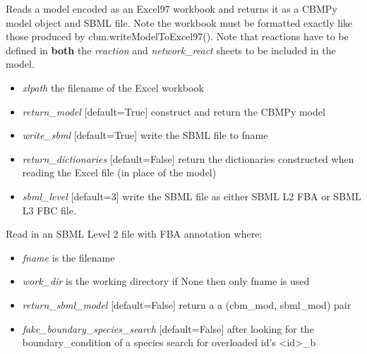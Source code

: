 \documentclass[a4paper,11pt,english]{sphinxmanual}
\begin{document}

\begin{fulllineitems}
\label{modules_doc:cbmpy.CBRead.readExcel97Model}
Reads a model encoded as an Excel97 workbook and returns it as a CBMPy model object and SBML file. Note the workbook must be formatted
exactly like those produced by cbm.writeModelToExcel97(). Note that reactions have to be defined in \textbf{both} the \emph{reaction}
and \emph{network\_react} sheets to be included in the model.
\begin{itemize}
\item {} 
\emph{xlpath} the filename of the Excel workbook

\item {} 
\emph{return\_model} {[}default=True{]} construct and return the CBMPy model

\item {} 
\emph{write\_sbml} {[}default=True{]} write the SBML file to fname

\item {} 
\emph{return\_dictionaries} {[}default=False{]} return the dictionaries constructed when reading the Excel file (in place of the model)

\item {} 
\emph{sbml\_level} {[}default=3{]} write the SBML file as either SBML L2 FBA or SBML L3 FBC file.

\end{itemize}

\end{fulllineitems}


\begin{fulllineitems}
\label{modules_doc:cbmpy.CBRead.readSBML2FBA}
Read in an SBML Level 2 file with FBA annotation where:
\begin{itemize}
\item {} 
\emph{fname} is the filename

\item {} 
\emph{work\_dir} is the working directory if None then only fname is used

\item {} 
\emph{return\_sbml\_model} {[}default=False{]} return a a (cbm\_mod, sbml\_mod) pair

\item {} 
\emph{fake\_boundary\_species\_search} {[}default=False{]} after looking for the boundary\_condition of a species search for overloaded id's \textless{}id\textgreater{}\_b

\end{itemize}

\end{fulllineitems}
\end{document}
